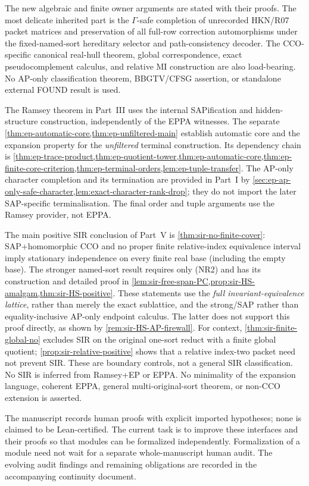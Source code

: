 \documentclass[11pt,a4paper]{article}
\theoremstyle{remark}\newtheorem{remark}[theorem]{Remark}
\theoremstyle{definition}
\theoremstyle{remark}
\begin{document}
The new algebraic and finite owner arguments are stated with
their proofs.  The most delicate inherited part is the
\(\Gamma\)-safe completion of unrecorded HKN/R07 packet matrices
and preservation of all full-row correction automorphisms
under the fixed-named-sort hereditary selector and
path-consistency decoder.  The CCO-specific canonical real-hull
theorem, global correspondence, exact pseudocomplement calculus,
and relative MI construction are also load-bearing.
No AP-only classification theorem, BBGTV/CFSG assertion, or
standalone external FOUND result is used.

The Ramsey theorem in Part~III uses the internal SAPification and
hidden-structure construction, independently of the EPPA witnesses.
The separate \cref{thm:ep-automatic-core,thm:ep-unfiltered-main}
establish automatic core and the expansion property for the
\emph{unfiltered} terminal construction. Its dependency chain is
\cref{thm:ep-trace-product,thm:ep-quotient-tower,thm:ep-automatic-core,thm:ep-finite-core-criterion,thm:ep-terminal-orders,lem:ep-tuple-transfer}.
The AP-only character completion and its termination are provided in
Part~I by \cref{sec:ep-ap-only-safe-character,lem:exact-character-rank-drop};
they do not import the later SAP-specific terminalisation. The final
order and tuple arguments use the Ramsey provider, not EPPA.

The main positive SIR conclusion of Part~V is
\cref{thm:sir-no-finite-cover}: SAP+homomorphic CCO and no
proper finite relative-index equivalence interval imply
stationary independence on every finite real base (including
the empty base). The stronger named-sort result requires
only (NR2) and has its construction and detailed proof in
\cref{lem:sir-free-span-PC,prop:sir-HS-amalgam,thm:sir-HS-positive}.
These statements use the \emph{full invariant-equivalence
lattice}, rather than merely the exact sublattice, and the
strong/SAP rather than equality-inclusive AP-only endpoint
calculus. The latter does not support this proof directly,
as shown by \cref{rem:sir-HS-AP-firewall}.
For context, \cref{thm:sir-finite-global-no} excludes SIR on
the original one-sort reduct with a finite global quotient;
\cref{prop:sir-relative-positive} shows that a relative
index-two packet need not prevent SIR. These are boundary
controls, not a general SIR classification. No SIR is
inferred from Ramsey+EP or EPPA.
No minimality of the expansion language, coherent EPPA, general
multi-original-sort theorem, or non-CCO extension is asserted.

The manuscript records human proofs with explicit imported hypotheses;
none is claimed to be Lean-certified. The current task is to improve
these interfaces and their proofs so that modules can be formalized
independently. Formalization of a module need not wait for a separate
whole-manuscript human audit. The evolving audit findings and remaining
obligations are recorded in the accompanying continuity document.
\end{document}
